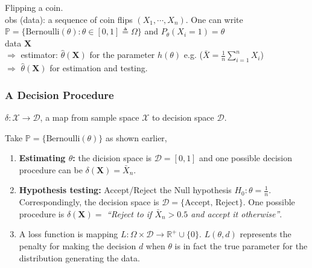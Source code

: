 \begin{example}
    Flipping a coin.\\
    
    obs (data): a sequence of coin flips $(X_1,\cdots,X_n)$. 
    One can write $\mathbb{P}=\{\text{Bernoulli}(\theta): \theta\in[0,1]\triangleq\Omega\}$ and $P_\theta(X_i=1)=\theta$\\
    
    data $\boldsymbol{X}$\\
    $\Rightarrow$ estimator: $\hat{\theta}(\boldsymbol{X})$ for the parameter $h(\theta)$ 
    {\color{gray} e.g. ($\bar{X}=\frac{1}{n}\sum_{i=1}^nX_i$)}\\
    $\Rightarrow$ $\hat{\theta}(\boldsymbol{X})$ for estimation and testing.
\end{example}

\subsubsection{A Decision Procedure}
\begin{definition}[Estimator]
    $\delta:\mathcal{X}\to\mathcal{D}$, 
    a map from sample space $\mathcal{X}$ to decision space $\mathcal{D}$.
\end{definition}

\begin{example}
    Take $\mathbb{P}=\{\text{Bernoulli}(\theta)\}$ as shown earlier,
    \begin{enumerate}
        \item \textbf{Estimating $\theta$:} 
        the dicision space is $\mathcal{D}=[0,1]$ and 
        one possible decision procedure can be 
        $\delta(\boldsymbol{X})=\bar{X}_n$.
        \item \textbf{Hypothesis testing:} 
        Accept/Reject the Null hypothesis $H_0:\theta=\frac{1}{n}$. 
        Correspondingly, the decision space is $\mathcal{D}=\{\text{Accept, Reject}\}$.
        One possible procedure is $\delta(\boldsymbol{X})=$
        \textit{``Reject to if $\bar{X}_n > 0.5$ and accept it otherwise''}.
        \item A loss function is mapping $L: \Omega\times\mathcal{D} \to \mathbb{R}^+\cup{\{0\}}$.
        $L(\theta, d)$  represents the penalty for making the decision $d$ 
        when $\theta$ is in fact the true parameter for the distribution generating the data.
    \end{enumerate}
\end{example}


